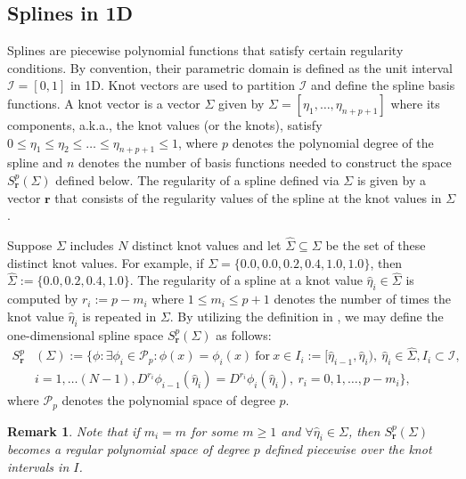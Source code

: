 \documentclass[final]{amsart}%
\newtheorem{remark}{Remark}
\newcommand{\0}{\mathaccent23}
\newcommand{\br}{\mathbf r}
\begin{document}
\subsection{Splines in 1D} \label{sec:splines}

Splines are piecewise polynomial functions that satisfy certain regularity conditions. By convention, their parametric domain is defined as the unit interval $\mathcal{I}=[0,1]$ in 1D. Knot vectors are used to partition $\mathcal{I}$ and define the spline basis functions. A knot vector is a vector $\Sigma$ given by  $\Sigma=[\eta_1,\dots, \eta_{n+p+1}]$ where its components, a.k.a., the knot values (or the knots), satisfy $0\le \eta_{1}\le \eta_2 \le \dots \le  \eta_{n+p+1}\le 1$,  where $p$ denotes the polynomial degree of the spline and $n$ denotes the number of basis functions needed to construct the space $S^p_{\br}(\Sigma)$ defined below. The regularity of a spline defined via $\Sigma$ is given by a vector $\br$ that consists of the regularity values of the spline at the knot values in $\Sigma$. 

Suppose $\Sigma$ includes $N$ distinct knot values and let $\hat{\Sigma}\subseteq \Sigma$ be the set of these distinct knot values. For example, if $\Sigma=\{0.0,0.0,0.2,0.4,1.0,1.0\}$, then $\hat{\Sigma}:=\{0.0,0.2,0.4,1.0\}$. The regularity of a spline at a knot value $\hat{\eta}_i\in \hat{\Sigma}$ is computed by $r_i:=p-m_i$ where $1\le m_i\le p+1$ denotes the number of times the knot value $\hat{\eta}_i$ is repeated in $\Sigma$. 
By utilizing the definition in \cite{schumaker}, we may define the one-dimensional spline space $S^p_{\br}(\Sigma)$ as follows:
\begin{align*}\label{eq:splinesp}
S^p_{\br}&(\Sigma):=\{ \phi:  \exists \phi_i\in \mathcal{P}_p: \phi(x)= \phi_i(x)\ \text{for}\ x\in I_i:=[\hat{\eta}_{i-1},\hat{\eta}_i),\ \hat{\eta}_i\in \hat{\Sigma}, I_i\subset \mathcal{I},\\  &i=1,\dots (N-1),  D^{r_i}\phi_{i-1}(\hat{\eta}_i)= D^{r_i}\phi_{i} (\hat{\eta}_i),\ r_i=0,1,\dots,p-m_i\},
\end{align*}
where $\mathcal{P}_p$ denotes the polynomial space of degree $p$. 

\begin{remark}\label{remarkps}
Note that if $m_i=m$ for some $m\ge 1$ and $\forall \hat{\eta}_i \in \Sigma$, then $S^p_{\br}(\Sigma)$ becomes a regular polynomial space of degree $p$ defined piecewise over the knot intervals in $I$.
\end{remark}
\end{document}
